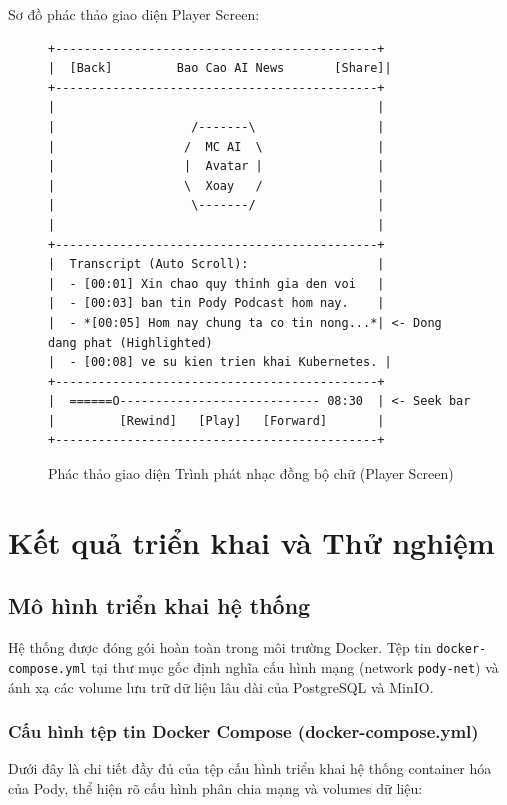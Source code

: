 \documentclass[12pt,a4paper]{report}
\begin{document}
Sơ đồ phác thảo giao diện Player Screen:
\begin{figure}[h!]
\centering
\begin{lstlisting}
+---------------------------------------------+
|  [Back]         Bao Cao AI News       [Share]|
+---------------------------------------------+
|                                             |
|                   /-------\                 |
|                  /  MC AI  \                |
|                  |  Avatar |                |
|                  \  Xoay   /                |
|                   \-------/                 |
|                                             |
+---------------------------------------------+
|  Transcript (Auto Scroll):                  |
|  - [00:01] Xin chao quy thinh gia den voi   |
|  - [00:03] ban tin Pody Podcast hom nay.    |
|  - *[00:05] Hom nay chung ta co tin nong...*| <- Dong dang phat (Highlighted)
|  - [00:08] ve su kien trien khai Kubernetes. |
+---------------------------------------------+
|  ======O---------------------------- 08:30  | <- Seek bar
|         [Rewind]   [Play]   [Forward]       |
+---------------------------------------------+
\end{lstlisting}
\caption{Phác thảo giao diện Trình phát nhạc đồng bộ chữ (Player Screen)}
\label{fig:ui_player}
\end{figure}

\chapter{Kết quả triển khai và Thử nghiệm}

\section{Mô hình triển khai hệ thống}
Hệ thống được đóng gói hoàn toàn trong môi trường Docker. Tệp tin \texttt{docker-compose.yml} tại thư mục gốc định nghĩa cấu hình mạng (network \texttt{pody-net}) và ánh xạ các volume lưu trữ dữ liệu lâu dài của PostgreSQL và MinIO.

\subsection{Cấu hình tệp tin Docker Compose (docker-compose.yml)}
Dưới đây là chi tiết đầy đủ của tệp cấu hình triển khai hệ thống container hóa của Pody, thể hiện rõ cấu hình phân chia mạng và volumes dữ liệu:
\end{document}
